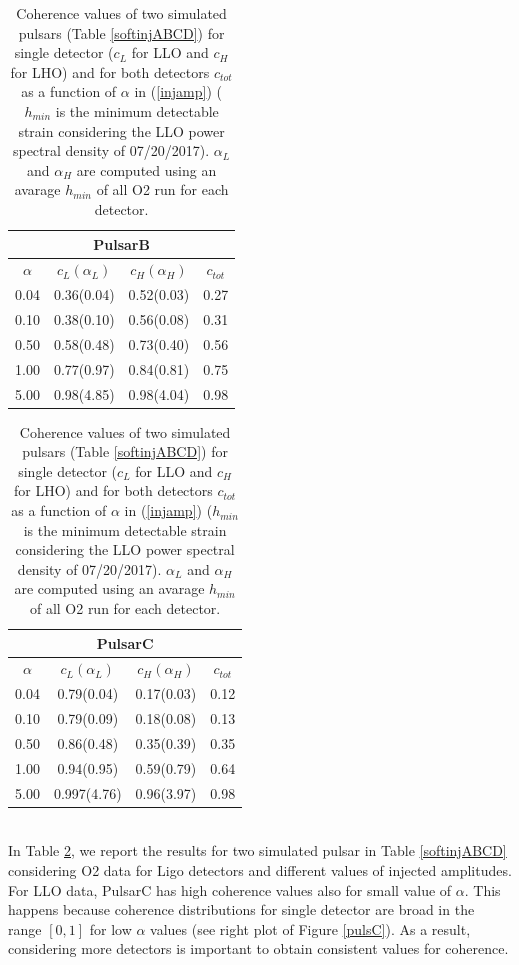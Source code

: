 \documentclass[11pt,a4paper,final]{iopart}
\begin{document}
\begin{table}[htpb!]
\begin{tabular}[t]{c|ccc}
   \multicolumn{4}{c}{\textbf{PulsarB}} \\
   \toprule
   $\alpha$ & $c_L(\alpha_L)$ &  $c_H(\alpha_H)$  & $c_{tot}$\\
\midrule 
0.04 & 0.36(0.04) & 0.52(0.03) & 0.27 \\
0.10 & 0.38(0.10) & 0.56(0.08) & 0.31 \\
0.50 & 0.58(0.48) & 0.73(0.40) & 0.56 \\
1.00 & 0.77(0.97) & 0.84(0.81) & 0.75 \\
5.00 & 0.98(4.85) & 0.98(4.04) & 0.98 \\

\bottomrule
\end{tabular}
\hspace{1cm}
\begin{tabular}[t]{c|ccc}
   \multicolumn{4}{c}{\textbf{PulsarC}} \\
\toprule
   $\alpha$ & $c_L(\alpha_L)$ &  $c_H(\alpha_H)$  & $c_{tot}$\\
\midrule 
0.04 & 0.79(0.04) & 0.17(0.03) & 0.12 \\
0.10 & 0.79(0.09) & 0.18(0.08) & 0.13 \\
0.50 & 0.86(0.48) & 0.35(0.39) & 0.35 \\
1.00 & 0.94(0.95) & 0.59(0.79) & 0.64 \\
5.00 & 0.997(4.76) & 0.96(3.97) & 0.98 \\

\bottomrule
\end{tabular}
 \caption{ Coherence values of two simulated pulsars (Table \ref{softinjABCD}) for single detector ($c_L$ for LLO and $c_H$ for LHO) and for both detectors $c_{tot}$ as a function of $\alpha$ in (\ref{injamp}) ($h_{min}$ is the minimum detectable strain considering the LLO power spectral density of 07/20/2017). $\alpha_L$ and $\alpha_H$ are computed using an avarage $h_{min}$ of all O2 run for each detector.}
\label{riscohe}
\end{table}
\\In Table \ref{riscohe}, we report the results for two simulated pulsar in Table \ref{softinjABCD} considering O2 data for Ligo detectors and different values of injected amplitudes. For LLO data, PulsarC has high coherence values also for small value of $\alpha$. This happens because coherence distributions for single detector are broad in the range $[0,1]$ for low $\alpha$ values (see right plot of Figure \ref{pulsC}). As a result, considering more detectors is important to obtain consistent values for coherence.
\end{document}
